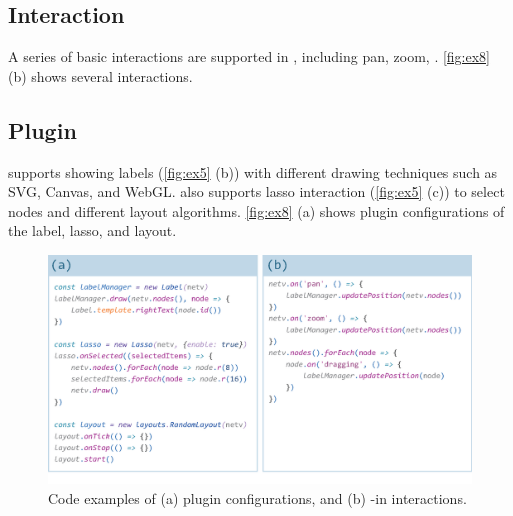 

\subsection{Interaction}
A series of basic interactions are supported in \name, including pan, zoom,   . \autoref{fig:ex8} (b) shows several  interactions.

\subsection{Plugin}

\name supports showing labels (\autoref{fig:ex5} (b)) with different drawing techniques\added[id=kg]{,} such as SVG, Canvas, and WebGL. \name also supports lasso interaction (\autoref{fig:ex5} (c)) to select nodes and different layout algorithms. \autoref{fig:ex8} (a) shows  plugin configurations of the label, lasso, and layout.


\begin{figure}
\includegraphics[width=\linewidth]{fig/ex8.eps}
\caption{
    Code examples of (a) plugin configurations, and (b) -in interactions.
}
\label{fig:ex8}
\end{figure}

